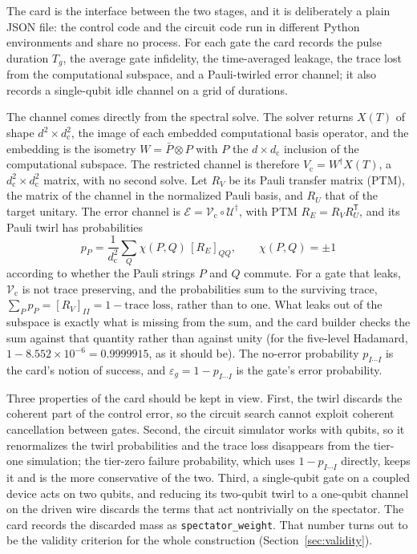 \documentclass[10pt]{article}
\newcommand{\dc}{d_{\mathrm c}}
\begin{document}
The card is the interface between the two stages, and it is deliberately a
plain JSON file: the control code and the circuit code run in different Python
environments and share no process. For each gate the card records the pulse
duration $T_g$, the average gate infidelity, the time-averaged leakage, the
trace lost from the computational subspace, and a Pauli-twirled error channel;
it also records a single-qubit idle channel on a grid of durations.

The channel comes directly from the spectral solve. The solver returns $X(T)$
of shape $d^2 \times \dc^2$, the image of each embedded computational basis
operator, and the embedding is the isometry $W = \bar P \otimes P$ with $P$ the
$d \times \dc$ inclusion of the computational subspace. The restricted channel
is therefore $V_{\mathrm c} = W^\dagger X(T)$, a $\dc^2 \times \dc^2$ matrix,
with no second solve. Let $R_V$ be its Pauli transfer matrix (PTM), the matrix
of the channel in the normalized Pauli basis, and $R_U$ that of the target
unitary. The error channel is $\mathcal E = \mathcal V_{\mathrm c} \circ
\mathcal U^\dagger$, with PTM $R_E = R_V R_U^{\mathsf T}$, and its Pauli twirl
\cite{Wallman2016} has probabilities
\begin{equation}
  p_P = \frac{1}{\dc^2} \sum_Q \chi(P,Q)\, [R_E]_{QQ},
  \qquad \chi(P,Q) = \pm 1
  \label{eq:twirl}
\end{equation}
according to whether the Pauli strings $P$ and $Q$ commute. For a gate that
leaks, $\mathcal V_{\mathrm c}$ is not trace preserving, and the probabilities
sum to the surviving trace, $\sum_P p_P = [R_V]_{II} = 1 - \text{trace loss}$,
rather than to one. What leaks out of the subspace is exactly what is missing
from the sum, and the card builder checks the sum against that quantity rather
than against unity (for the five-level Hadamard,
$1 - 8.552\times10^{-6} = 0.9999915$, as it should be). The no-error
probability $p_{I\cdots I}$ is the card's notion of success, and
$\varepsilon_g = 1 - p_{I\cdots I}$ is the gate's error probability.

Three properties of the card should be kept in view. First, the twirl
discards the coherent part of the control error, so the circuit search cannot
exploit coherent cancellation between gates. Second, the circuit simulator
works with qubits, so it renormalizes the twirl probabilities and the trace
loss disappears from the tier-one simulation; the tier-zero failure
probability, which uses $1 - p_{I\cdots I}$ directly, keeps it and is the more
conservative of the two. Third, a single-qubit gate on a coupled device acts
on two qubits, and reducing its two-qubit twirl to a one-qubit channel on the
driven wire discards the terms that act nontrivially on the spectator. The card
records the discarded mass as \texttt{spectator\_weight}. That number turns out
to be the validity criterion for the whole construction
(Section~\ref{sec:validity}).
\end{document}
